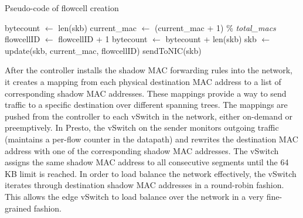 \begin{algorithm}[t]
\caption{Pseudo-code of flowcell creation}
\label{alg:flowcell}
\begin{algorithmic}[1]
\STATE bytecount $\leftarrow$ len(skb)
\STATE current\_mac $\leftarrow$ (current\_mac + 1) \% {\emph {total\_macs}}
\STATE flowcellID $\leftarrow$ flowcellID + 1
\ELSE
\STATE bytecount $\leftarrow$ bytecount + len(skb)
\ENDIF
\STATE skb $\leftarrow$ update(skb, current\_mac, flowcellID)
\STATE sendToNIC(skb)
\end{algorithmic}
\end{algorithm}
After the controller installs the shadow MAC forwarding rules into the network, it creates a mapping
from each physical destination MAC address to a list of corresponding shadow MAC addresses. These mappings
provide a way to send traffic to a specific destination over different spanning trees. 
The mappings are pushed from the controller to each vSwitch in the network, either on-demand or preemptively.
In Presto, the vSwitch on the sender monitors outgoing traffic (\ie{}maintains a per-flow counter in the datapath) 
and rewrites the destination MAC
address with one of the corresponding shadow MAC addresses.
The vSwitch assigns the same shadow MAC address to all consecutive segments until the 64 KB limit is reached.
In order to load balance the network effectively, the vSwitch 
iterates through destination shadow MAC addresses in a round-robin fashion. 
This allows the edge vSwitch to load balance over the network in a very fine-grained fashion.

